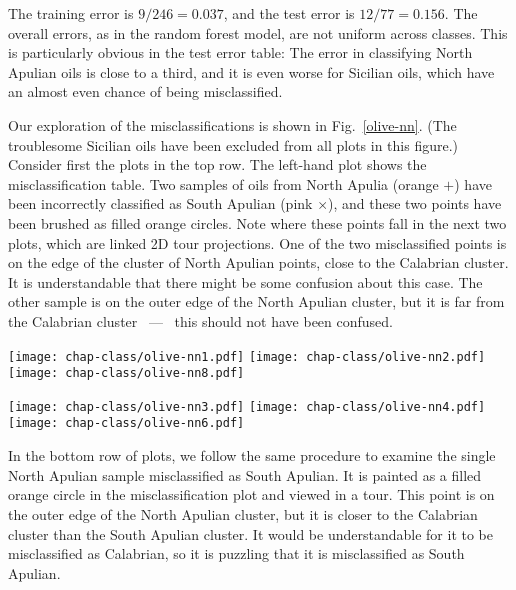 \bigskip

\noindent The training error is $9/246=0.037$, and the test error is
$12/77=0.156$.  The overall errors, as in the random forest model, are
not uniform across classes.  This is particularly obvious in the test
error table: The error in classifying North Apulian oils is close to a
third, and it is even worse for Sicilian oils, which have an almost
even chance of being misclassified.

Our exploration of the misclassifications is shown in
Fig.~\ref{olive-nn}.  (The troublesome Sicilian oils have been
excluded from all plots in this figure.)  Consider first the plots in
the top row.  The left-hand plot shows the misclassification table.
Two samples of oils from North Apulia (orange $+$) have been
incorrectly classified as South Apulian (pink $\times$), and these two
points have been brushed as filled orange circles.  Note where these
points fall in the next two plots, which are linked 2D tour
projections.  One of the two
misclassified points is on the edge of the cluster of North Apulian
points, close to the Calabrian cluster. It is understandable that
there might be some confusion about this case. The other sample is on
the outer edge of the North Apulian cluster, but it is far from the
Calabrian cluster ~---~ this should not have been confused.

\begin{figure*}[htbp]
\centerline{
 {\texttt{[image: chap-class/olive-nn1.pdf]}}
 {\texttt{[image: chap-class/olive-nn2.pdf]}}
 {\texttt{[image: chap-class/olive-nn8.pdf]}}}
\smallskip
\centerline{
 {\texttt{[image: chap-class/olive-nn3.pdf]}}
 {\texttt{[image: chap-class/olive-nn4.pdf]}}
 {\texttt{[image: chap-class/olive-nn6.pdf]}}}
\caption[Misclassifications of a feed-forward neural network
classifying the oils from the South]{Misclassifications of a
feed-forward neural network classifying the oils from the South by
. A representation of the misclassification table {\bf (left
column)} is linked to projections viewed in a 2D tour. Different
misclassifications are examined in the top and bottom rows. (The
Sicilian oils, which would have appeared in the top row of the
misclassification tables, have been removed from all plots.)  }
\label{olive-nn}
\end{figure*}

In the bottom row of plots, we follow the same procedure to examine
the single North Apulian sample misclassified as South Apulian. It is
painted as a filled orange circle in the misclassification plot and
viewed in a  tour. This point is on the outer edge
of the North Apulian cluster, but it is closer to the Calabrian cluster
than the South Apulian cluster. It would be understandable for it to
be misclassified as Calabrian, so it is puzzling that it is
misclassified as South Apulian.

